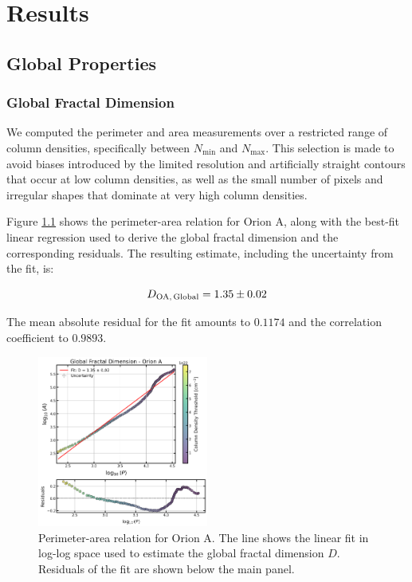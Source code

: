 \chapter{Results}
\label{ch:results}

\section{Global Properties}

\subsection{Global Fractal Dimension}

We computed the perimeter and area measurements over a restricted range of column densities, specifically between $N_\mathrm{min}$ and $N_\mathrm{max}$. This selection is made to avoid biases introduced by the limited resolution and artificially straight contours that occur at low column densities, as well as the small number of pixels and irregular shapes that dominate at very high column densities.

Figure \ref{fig:orion_A_global} shows the perimeter-area relation for Orion A, along with the best-fit linear regression used to derive the global fractal dimension and the corresponding residuals. The resulting estimate, including the uncertainty from the fit, is:

\begin{equation}
    \notag
    D_{\mathrm{OA,\,Global}} = 1.35 \pm 0.02
\end{equation}

The mean absolute residual for the fit amounts to $0.1174$ and the correlation coefficient to $0.9893$.

\begin{figure}[t]
    \centering
    \includegraphics[width=0.5\textwidth]{figures/orion_A_global.png}
    \caption{Perimeter-area relation for Orion A. The line shows the linear fit in log-log space used to estimate the global fractal dimension $D$. Residuals of the fit are shown below the main panel.}
    \label{fig:orion_A_global}
\end{figure}

